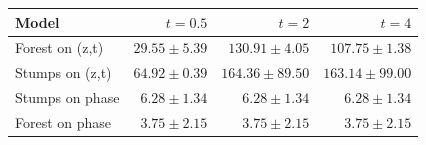 \begin{tabular}{lrrr}
\toprule
Model & $t=0.5$ & $t=2$ & $t=4$\\
\midrule
Forest on (z,t) & $29.55\pm5.39$ & $130.91\pm4.05$ & $107.75\pm1.38$\\
Stumps on (z,t) & $64.92\pm0.39$ & $164.36\pm89.50$ & $163.14\pm99.00$\\
Stumps on phase & $6.28\pm1.34$ & $6.28\pm1.34$ & $6.28\pm1.34$\\
Forest on phase & $3.75\pm2.15$ & $3.75\pm2.15$ & $3.75\pm2.15$\\
\bottomrule
\end{tabular}
